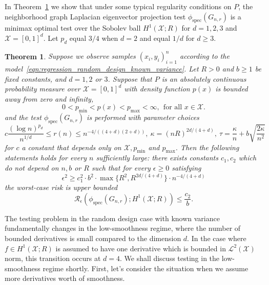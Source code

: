 \documentclass{article}
\newcommand{\1}{\mathbf{1}}
\newcommand{\Xset}{\mathcal{X}}
\newcommand{\Leb}{\mathcal{L}}
\newcommand{\spec}{\mathrm{spec}}
\theoremstyle{alden}
\theoremstyle{aldenthm}
\newtheorem{theorem}{Theorem}
\theoremstyle{definition}
\theoremstyle{remark}
\begin{document}
In Theorem~\ref{thm:sobolev_testing_rate_order1} we show that under some typical regularity conditions on $P$, the neighborhood graph Laplacian eigenvector projection test $\phi_{\textrm{spec}}(G_{n,r})$ is a minimax optimal test over the Sobolev ball $H^1(\mathcal{X};R)$ for $d = 1,2,3$ and $\Xset = [0,1]^d$. Let $p_d$ equal $3/4$ when $d = 2$ and equal $1/d$ for $d \geq 3$.

\begin{theorem}
	\label{thm:sobolev_testing_rate_order1}
	Suppose we observe samples $(x_i,y_i)_{i = 1}^{n}$ according to the model~\eqref{eqn:regression_random_design_known_variance}. Let $R > 0$ and $b \geq 1$ be fixed constants, and $d = 1,2$ or $3$. Suppose that $P$ is an absolutely continuous probability measure over $\mathcal{X} = [0,1]^d$ with density function $p(x)$ is bounded away from zero and infinity, 
	\begin{equation*}
	0 < p_{\min} < p(x) < p_{\max} < \infty,~~ \textrm{for all $x \in \mathcal{X}$.}
	\end{equation*}
	and the test $\phi_{\spec}(G_{n,r})$ is performed with parameter choices
	\begin{equation*}
	c \frac{(\log n)^{p_d}}{n^{1/d}} \leq r(n) \leq n^{-4/((4 + d)(2+d))}, ~\kappa = (nR)^{2d/(4 + d)}, ~\tau = \frac{\kappa}{n} + b\sqrt{\frac{2\kappa}{n^2}}
	\end{equation*}
	for $c$ a constant that depends only on $\Xset, p_{\min}$ and $p_{\max}$. Then the following statements holds for every $n$ sufficiently large: there exists constants $c_1,c_2$ which do not depend on $n,b$ or $R$ such that for every $\epsilon \geq 0$ satisfying
	\begin{equation}
	\label{eqn:sobolev_testing_rate_order1}
	\epsilon^2 \geq c_1^2 \cdot b^2 \cdot \max\{R^2,R^{2d/(4 + d)}\} \cdot n^{-4/(4 + d)}
	\end{equation}
	the worst-case risk is upper bounded
	\begin{equation}
	\label{eqn:sobolev_testing_rate_order1_1}
	\mathcal{R}_{\epsilon}(\phi_{\mathrm{spec}}(G_{n,r}); H^1(\mathcal{X};R)) \leq \frac{c_2}{b}.
	\end{equation}
\end{theorem}

The testing problem in the random design case with known variance fundamentally changes in the low-smoothness regime, where the number of bounded derivatives is small compared to the dimension $d$. In the case where $f \in H^1(\Xset;R)$ is assumed to have one derivative which is bounded in $\Leb^2(\Xset)$ norm, this transition occurs at $d = 4$. We shall discuss testing in the low-smoothness regime shortly. First, let's consider the situation when we assume more derivatives worth of smoothness.
\end{document}
